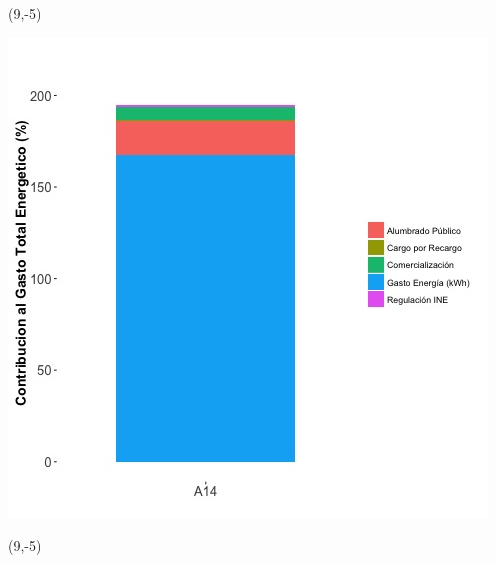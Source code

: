 \documentclass{article}\usepackage[]{graphicx}\usepackage[]{color}
\newenvironment{knitrout}{}{} %
\begin{document}
 \begin{textblock}{1}(9,-5)
\begin{minipage}{20em}
\begingroup

\endgroup
\end{minipage}
\end{textblock}

\begin{knitrout}
\color{fgcolor}
\includegraphics[scale=0.65]{figure/A14_costvars_plot.jpg} 
\end{knitrout}

 \begin{textblock}{1}(9,-5)
\begin{minipage}{20em}
\begingroup

\endgroup
\end{minipage}
\end{textblock}
\end{document}

